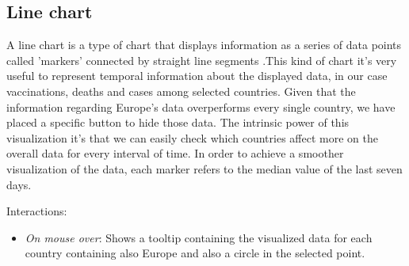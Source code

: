 \documentclass[10pt,conference]{IEEEtran}
\begin{document}
\begin{figure}
\end{figure}
\subsection{Line chart}
A line chart is a type of chart that displays information as a series of data points called ’markers’ connected by straight 
line segments \cite{line}.This kind of chart it’s very useful to represent temporal information about the displayed data,
in our case vaccinations, deaths and cases among selected countries. Given that the information regarding Europe's data 
overperforms every single country, we have placed a specific button to hide those data. The intrinsic power of this visualization it’s 
that we can easily check which countries affect more on the overall data for every interval of time.
In order to achieve a smoother visualization of the data, each marker refers to the median value of the last seven days.

Interactions:
\begin{itemize}
	\item {\em On mouse over}: Shows a tooltip containing the visualized data for each country containing also Europe and also a circle in the selected point.
\end{itemize}

\begin{figure}
\end{figure}
\end{document}
